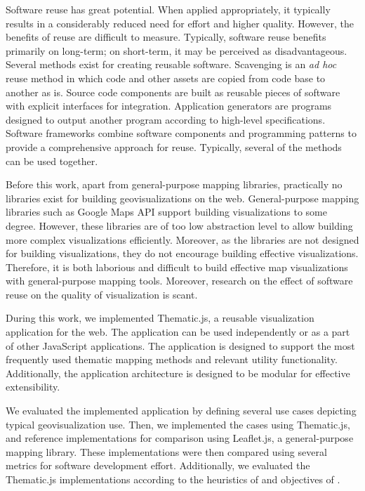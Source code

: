 Software reuse has great potential. When applied appropriately, it typically results in a considerably reduced need for effort and higher quality. However, the benefits of reuse are difficult to measure. Typically, software reuse benefits primarily on long-term; on short-term, it may be perceived as disadvantageous. Several methods exist for creating reusable software. Scavenging is an \emph{ad hoc} reuse method in which code and other assets are copied from code base to another as is. Source code components are built as reusable pieces of software with explicit interfaces for integration. Application generators are programs designed to output another program according to high-level specifications. Software frameworks combine software components and programming patterns to provide a comprehensive approach for reuse. Typically, several of the methods can be used together.

Before this work, apart from general-purpose mapping libraries, practically no libraries exist for building geovisualizations on the web. General-purpose mapping libraries such as Google Maps API support building visualizations to some degree. However, these libraries are of too low abstraction level to allow building more complex visualizations efficiently. Moreover, as the libraries are not designed for building visualizations, they do not encourage building effective visualizations. Therefore, it is both laborious and difficult to build effective map visualizations with general-purpose mapping tools. Moreover, research on the effect of software reuse on the quality of visualization is scant.

During this work, we implemented Thematic.js, a reusable visualization application for the web. The application can be used independently or as a part of other JavaScript applications. The application is designed to support the most frequently used thematic mapping methods and relevant utility functionality. Additionally, the application architecture is designed to be modular for effective extensibility.

We evaluated the implemented application by defining several use cases depicting typical geovisualization use. Then, we implemented the cases using Thematic.js, and reference implementations for comparison using Leaflet.js, a general-purpose mapping library. These implementations were then compared using several metrics for software development effort. Additionally, we evaluated the Thematic.js implementations according to the heuristics of \citet{zuk_heuristics_2006} and objectives of \citet{schlichtmann_visualization_2002}.


